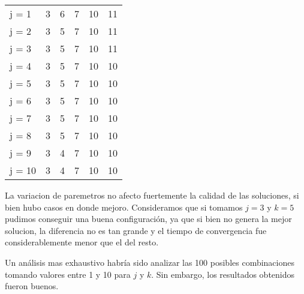 \begin{table}[H]
\begin{tabular}{|l|lllll|}
j = 1  & 3                           & 6                           & 7                           & 10                          & 11     \\ \cline{1-1}
j = 2  & 3                           & 5                           & 7                           & 10                          & 11     \\ \cline{1-1}
j = 3  & 3                           & 5                           & 7                           & 10                          & 11     \\ \cline{1-1}
j = 4  & 3                           & 5                           & 7                           & 10                          & 10     \\ \cline{1-1}
j = 5  & 3                           & 5                           & 7                           & 10                          & 10     \\ \cline{1-1}
j = 6  & 3                           & 5                           & 7                           & 10                          & 10     \\ \cline{1-1}
j = 7  & 3                           & 5                           & 7                           & 10                          & 10     \\ \cline{1-1}
j = 8  & 3                           & 5                           & 7                           & 10                          & 10     \\ \cline{1-1}
j = 9  & 3                           & 4                           & 7                           & 10                          & 10     \\ \cline{1-1}
j = 10 & 3                           & 4                           & 7                           & 10                          & 10     \\ \hline
\end{tabular}
\end{table}

La variacion de paremetros no afecto fuertemente la calidad de las soluciones, si bien hubo casos en donde mejoro. Consideramos que si tomamos $j = 3$ y $k = 5$ pudimos conseguir una buena configuración, ya que si bien no genera la mejor solucion, la diferencia no es tan grande y el tiempo de convergencia fue considerablemente menor que el del resto.

Un análisis mas exhaustivo habría sido analizar las 100 posibles combinaciones tomando valores entre 1 y 10 para $j$ y $k$. Sin embargo, los resultados obtenidos fueron buenos.